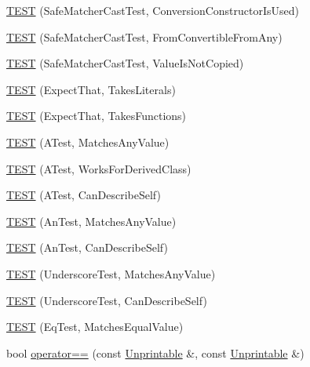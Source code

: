 \begin{DoxyCompactItemize}
\item 
\hyperlink{namespacetesting_1_1gmock__matchers__test_aa608f074e26876d41333cd265c4ca008}{T\+E\+ST} (Safe\+Matcher\+Cast\+Test, Conversion\+Constructor\+Is\+Used)
\item 
\hyperlink{namespacetesting_1_1gmock__matchers__test_a0490279eed67f8fa45f83c4951e1d8a1}{T\+E\+ST} (Safe\+Matcher\+Cast\+Test, From\+Convertible\+From\+Any)
\item 
\hyperlink{namespacetesting_1_1gmock__matchers__test_ac82f8355af7a1e6ba3b67ba8423a1d73}{T\+E\+ST} (Safe\+Matcher\+Cast\+Test, Value\+Is\+Not\+Copied)
\item 
\hyperlink{namespacetesting_1_1gmock__matchers__test_a7672c72f955b937542acd87d18dd7ea6}{T\+E\+ST} (Expect\+That, Takes\+Literals)
\item 
\hyperlink{namespacetesting_1_1gmock__matchers__test_aafaf5273bd3d8ba273a5dd243d3a52ba}{T\+E\+ST} (Expect\+That, Takes\+Functions)
\item 
\hyperlink{namespacetesting_1_1gmock__matchers__test_af15da53cdc65283b8ca688a03801fd12}{T\+E\+ST} (A\+Test, Matches\+Any\+Value)
\item 
\hyperlink{namespacetesting_1_1gmock__matchers__test_a2b2dfb85d18883b07f7d13d21abee2fc}{T\+E\+ST} (A\+Test, Works\+For\+Derived\+Class)
\item 
\hyperlink{namespacetesting_1_1gmock__matchers__test_a24432bc861bee430fb8ac1a4e5463ecf}{T\+E\+ST} (A\+Test, Can\+Describe\+Self)
\item 
\hyperlink{namespacetesting_1_1gmock__matchers__test_a15bf6771986d1e9f675f29861f7551c1}{T\+E\+ST} (An\+Test, Matches\+Any\+Value)
\item 
\hyperlink{namespacetesting_1_1gmock__matchers__test_ac3b18688ca5b5cf2d6137ce3e7397691}{T\+E\+ST} (An\+Test, Can\+Describe\+Self)
\item 
\hyperlink{namespacetesting_1_1gmock__matchers__test_a3fc77fa5ca709ef70963026fd7114552}{T\+E\+ST} (Underscore\+Test, Matches\+Any\+Value)
\item 
\hyperlink{namespacetesting_1_1gmock__matchers__test_a25ae831c15c9ca918ed847ba147ac572}{T\+E\+ST} (Underscore\+Test, Can\+Describe\+Self)
\item 
\hyperlink{namespacetesting_1_1gmock__matchers__test_a2ac5d4c2fae3e7f2e6c6be657a61f86a}{T\+E\+ST} (Eq\+Test, Matches\+Equal\+Value)
\item 
bool \hyperlink{namespacetesting_1_1gmock__matchers__test_a4b9f261a3b98ba0e0bca21b69d593241}{operator==} (const \hyperlink{classtesting_1_1gmock__matchers__test_1_1_unprintable}{Unprintable} \&, const \hyperlink{classtesting_1_1gmock__matchers__test_1_1_unprintable}{Unprintable} \&)

\end{DoxyCompactItemize}
